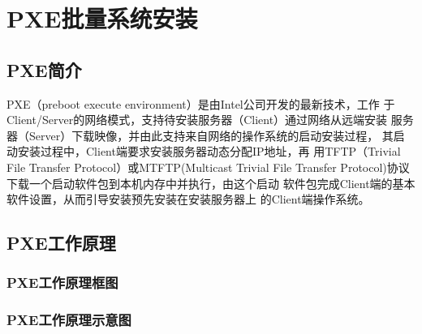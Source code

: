 \chapter{PXE批量系统安装}
\label{chap:susePXE}

\section{PXE简介}
\label{sec:introPXE}

PXE（preboot execute environment）是由Intel公司开发的最新技术，工作
于Client/Server的网络模式，支持待安装服务器（Client）通过网络从远端安装
服务器（Server）下载映像，并由此支持来自网络的操作系统的启动安装过程，
其启动安装过程中，Client端要求安装服务器动态分配IP地址，再
用TFTP（Trivial File Transfer Protocol）或MTFTP(Multicast Trivial File
Transfer Protocol)协议下载一个启动软件包到本机内存中并执行，由这个启动
软件包完成Client端的基本软件设置，从而引导安装预先安装在安装服务器上
的Client端操作系统。

\section{PXE工作原理}
\label{sec:topoPXE}

\subsection{PXE工作原理框图}
\label{sec:processPXE}

\subsection{PXE工作原理示意图}
\label{sec:processPXEInstance}

